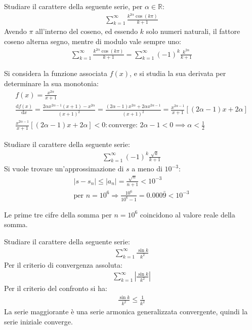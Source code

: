 \documentclass{article}
\numberwithin{equation}{subsection}
\begin{document}
Studiare il carattere della seguente serie, per $\alpha\in\mathbb{R}$:
\begin{gather*}
    \displaystyle\sum_{k=1}^\infty\frac{k^{2\alpha}\cos(k\pi)}{k+1}
\end{gather*}
Avendo $\pi$ all'interno del coseno, ed essendo $k$ solo numeri naturali, il fattore coseno alterna segno, mentre di modulo vale sempre uno:
\begin{gather*}
    \displaystyle\sum_{k=1}^\infty\frac{k^{2\alpha}\cos(k\pi)}{k+1}=
    \sum_{k=1}^\infty(-1)^k\frac{k^{2\alpha}}{k+1}
\end{gather*}

Si considera la funzione associata $f(x)$, e si studia la sua derivata per determinare la sua monotonia:
\begin{gather*}
    f(x)=\displaystyle\frac{x^{2\alpha}}{x+1}\\
    \displaystyle\frac{\mathrm{d}f(x)}{\mathrm{d}x}=\frac{2\alpha x^{2\alpha-1}(x+1)-x^{2\alpha}}{(x+1)^2}=
    \frac{(2\alpha-1)x^{2\alpha}+2\alpha x^{2\alpha-1}}{(x+1)^2}=\frac{x^{2\alpha-1}}{x+1}\left[(2\alpha-1)x+2\alpha\right]\\\frac{x^{2\alpha-1}}{x+1}\left[(2\alpha-1)x+2\alpha\right]<0:\mbox{converge}:\,2\alpha-1<0\implies\alpha<\frac{1}{2}
\end{gather*}


Studiare il carattere della seguente serie:
\begin{gather*}
    \displaystyle\sum_{k=1}^\infty(-1)^k\frac{\sqrt{k}}{k+1}
\end{gather*}
Si vuole trovare un'approssimazione di $s$ a meno di $10^{-3}$:
\begin{gather*}
    |s-s_n|\leq|a_n|=\displaystyle\frac{\sqrt{n}}{n+1}<10^{-3}\\
    \text{per }n=10^6\Rightarrow\frac{10^6}{10^6-1}=0.000\bar{9}<10^{-3}
\end{gather*}

Le prime tre cifre della somma per $n=10^6$ coincidono al valore reale della somma. 




Studiare il carattere della seguente serie:
\begin{gather*}
    \displaystyle\sum_{k=1}^\infty\frac{\sin k}{k^2}
\end{gather*}
Per il criterio di convergenza assoluta:
\begin{gather*}
    \displaystyle\sum_{k=1}^\infty\left|\frac{\sin k}{k^2}\right|
\end{gather*}
Per il criterio del confronto si ha:
\begin{gather*}
    \displaystyle\frac{\sin k}{k^2}\leq\frac{1}{k^2}
\end{gather*}
La serie maggiorante è una serie armonica generalizzata convergente, quindi la serie iniziale converge. 
\end{document}
